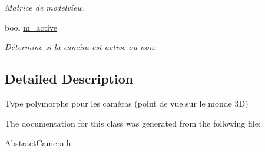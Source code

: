 \begin{DoxyCompactItemize}
\begin{DoxyCompactList}\small\item\em Matrice de modelview. \end{DoxyCompactList}\item 
\hypertarget{classAbstractCamera_ad40646721bbb5ec24fe9fb2080763e51}{bool \hyperlink{classAbstractCamera_ad40646721bbb5ec24fe9fb2080763e51}{m\+\_\+active}}\label{classAbstractCamera_ad40646721bbb5ec24fe9fb2080763e51}

\begin{DoxyCompactList}\small\item\em Détermine si la caméra est active ou non. \end{DoxyCompactList}\end{DoxyCompactItemize}


\subsection{Detailed Description}
Type polymorphe pour les caméras (point de vue sur le monde 3\+D) 

The documentation for this class was generated from the following file\+:\begin{DoxyCompactItemize}
\item 
\hyperlink{AbstractCamera_8h}{Abstract\+Camera.\+h}\end{DoxyCompactItemize}
